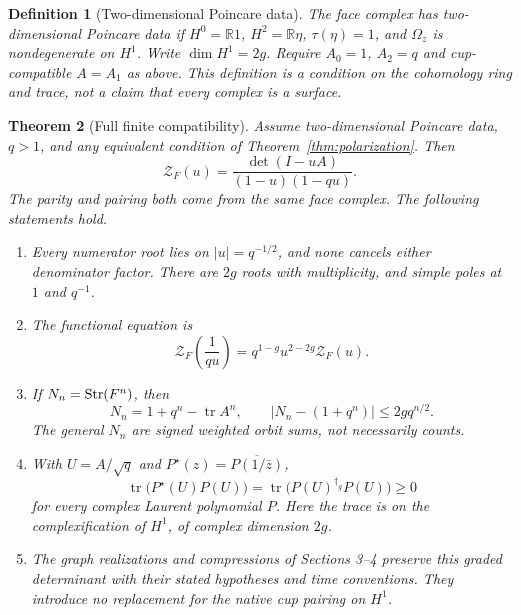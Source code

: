 \documentclass[11pt,a4paper]{article}
\newtheorem{definition}{Definition}[section]
\newtheorem{theorem}[definition]{Theorem}
\theoremstyle{remark}\newtheorem{remark}[definition]{Remark}
\newcommand{\R}{\mathbb R}\newcommand{\C}{\mathbb C}\newcommand{\Z}{\mathbb Z}
\newcommand{\tr}{\operatorname{tr}}\newcommand{\im}{\operatorname{im}}
\begin{document}
\begin{definition}[Two-dimensional Poincare data]
The face complex has two-dimensional Poincare data if $H^0=\R1$, $H^2=\R\eta$, $\tau(\eta)=1$, and $\Omega_z$ is nondegenerate on $H^1$. Write $\dim H^1=2g$. Require $A_0=1$, $A_2=q$ and cup-compatible $A=A_1$ as above. This definition is a condition on the cohomology ring and trace, not a claim that every complex is a surface.
\end{definition}

\begin{theorem}[Full finite compatibility]\label{thm:main}
Assume two-dimensional Poincare data, $q>1$, and any equivalent condition of Theorem~\ref{thm:polarization}. Then
\[
\boxed{\mathcal Z_F(u)=\frac{\det(I-uA)}{(1-u)(1-qu)}}.\tag{6.1}\label{eq:main}
\]
The parity and pairing both come from the same face complex. The following statements hold.
\begin{enumerate}[label=(\alph*)]
\item Every numerator root lies on $|u|=q^{-1/2}$, and none cancels either denominator factor. There are $2g$ roots with multiplicity, and simple poles at $1$ and $q^{-1}$.
\item The functional equation is
\[
\mathcal Z_F\left(\frac1{qu}\right)=q^{1-g}u^{2-2g}\mathcal Z_F(u).
\tag{6.2}
\]
\item If $N_n=\operatorname{Str}(F^n)$, then
\[
N_n=1+q^n-\tr A^n,\qquad |N_n-(1+q^n)|\le2gq^{n/2}.
\tag{6.3}
\]
The general $N_n$ are signed weighted orbit sums, not necessarily counts.
\item With $U=A/\sqrt q$ and $P^\star(z)=\overline{P(1/\bar z)}$,
\[
\tr\bigl(P^\star(U)P(U)\bigr)
=\tr\bigl(P(U)^{\dagger_g}P(U)\bigr)\ge0
\tag{6.4}\label{eq:weil}
\]
for every complex Laurent polynomial $P$. Here the trace is on the complexification of $H^1$, of complex dimension $2g$.
\item The graph realizations and compressions of Sections 3--4 preserve this graded determinant with their stated hypotheses and time conventions. They introduce no replacement for the native cup pairing on $H^1$.
\end{enumerate}
\end{theorem}
\end{document}
